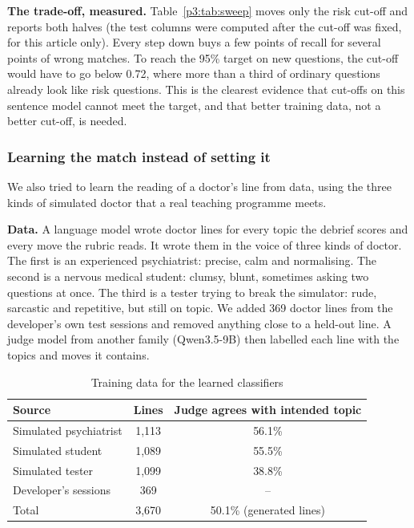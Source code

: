 \documentclass[journal]{IEEEtran}
\begin{document}
\textbf{The trade-off, measured.} Table~\ref{p3:tab:sweep} moves only the risk cut-off and reports both halves (the test columns were computed
after the cut-off was fixed, for this article only). Every step down buys a few points of recall for several points of wrong matches. To reach
the 95\% target on new questions, the cut-off would have to go below 0.72, where more than a third of ordinary questions already look like risk
questions. This is the clearest evidence that cut-offs on this sentence model cannot meet the target, and that better training data, not a
better cut-off, is needed.

\subsubsection{Learning the match instead of setting it}
We also tried to learn the reading of a doctor's line from data, using the three kinds of simulated doctor that a real teaching programme meets.

\textbf{Data.} A language model wrote doctor lines for every topic the debrief scores and every move the rubric reads. It wrote them in the voice of three kinds of doctor. The first is an experienced psychiatrist: precise, calm and normalising. The second is a nervous medical student: clumsy, blunt, sometimes asking two questions at once. The third is a tester trying to break the simulator: rude, sarcastic and repetitive, but still on topic. We added 369 doctor lines from the developer's
own test sessions and removed anything close to a held-out line. A judge model from another family (Qwen3.5-9B) then labelled each line with
the topics and moves it contains.

\begin{table}[t]
\caption{Training data for the learned classifiers}
\label{p3:tab:train}
\centering
\footnotesize
\begin{tabular}{@{}lcc@{}}
\toprule
Source & Lines & Judge agrees with intended topic\\
\midrule
Simulated psychiatrist & 1,113 & 56.1\%\\
Simulated student & 1,089 & 55.5\%\\
Simulated tester & 1,099 & 38.8\%\\
Developer's sessions & 369 & --\\
\midrule
Total & 3,670 & 50.1\% (generated lines)\\
\bottomrule
\end{tabular}
\end{table}
\end{document}
